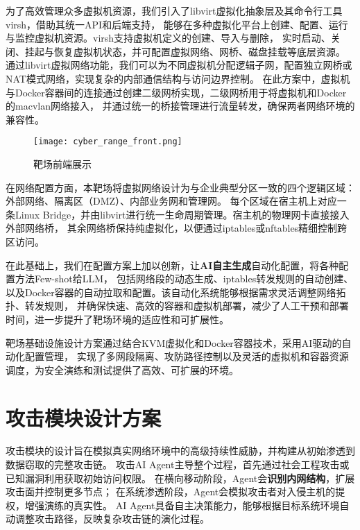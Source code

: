 \documentclass[lang=cn,10pt]{elegantbook}
\begin{document}
为了高效管理众多虚拟机资源，我们引入了libvirt虚拟化抽象层及其命令行工具virsh，借助其统一API和后端支持，
能够在多种虚拟化平台上创建、配置、运行与监控虚拟机资源。virsh支持虚拟机定义的创建、导入与删除，
实时启动、关闭、挂起与恢复虚拟机状态，并可配置虚拟网络、网桥、磁盘挂载等底层资源。
通过libvirt虚拟网络功能，我们可以为不同虚拟机分配逻辑子网，配置独立网桥或NAT模式网络，实现复杂的内部通信结构与访问边界控制。
在此方案中，虚拟机与Docker容器间的连接通过创建二级网桥实现，二级网桥用于将虚拟机和Docker的macvlan网络接入，
并通过统一的桥接管理进行流量转发，确保两者网络环境的兼容性。

\begin{figure}[H]
\centering
\texttt{[image: cyber\_range\_front.png]}  %
\caption{靶场前端展示}  %
\label{fig:front}  %
\end{figure}

在网络配置方面，本靶场将虚拟网络设计为与企业典型分区一致的四个逻辑区域：外部网络、隔离区（DMZ）、内部业务网和管理网。
每个区域在宿主机上对应一条Linux Bridge，并由libvirt进行统一生命周期管理。宿主机的物理网卡直接接入外部网络桥，
其余网络桥保持纯虚拟化，以便通过iptables或nftables精细控制跨区访问。

在此基础上，我们在配置方案上加以创新，让\textbf{AI自主生成}自动化配置，将各种配置方法Few-shot给LLM，
包括网络段的动态生成、iptables转发规则的自动创建、
以及Docker容器的自动拉取和配置。该自动化系统能够根据需求灵活调整网络拓扑、转发规则，
并确保快速、高效的容器和虚拟机部署，减少了人工干预和部署时间，进一步提升了靶场环境的适应性和可扩展性。

\begin{definition}
    靶场基础设施设计方案通过结合KVM虚拟化和Docker容器技术，采用AI驱动的自动化配置管理，
    实现了多网段隔离、攻防路径控制以及灵活的虚拟机和容器资源调度，为安全演练和测试提供了高效、可扩展的环境。
\end{definition}


\section{攻击模块设计方案}

攻击模块的设计旨在模拟真实网络环境中的高级持续性威胁，并构建从初始渗透到数据窃取的完整攻击链。
攻击AI Agent主导整个过程，首先通过社会工程攻击或已知漏洞利用获取初始访问权限。
在横向移动阶段，Agent会\textbf{识别内网结构}，扩展攻击面并控制更多节点；
在系统渗透阶段，Agent会模拟攻击者对入侵主机的提权，增强演练的真实性。
AI Agent具备自主决策能力，能够根据目标系统环境自动调整攻击路径，反映复杂攻击链的演化过程。
\end{document}
